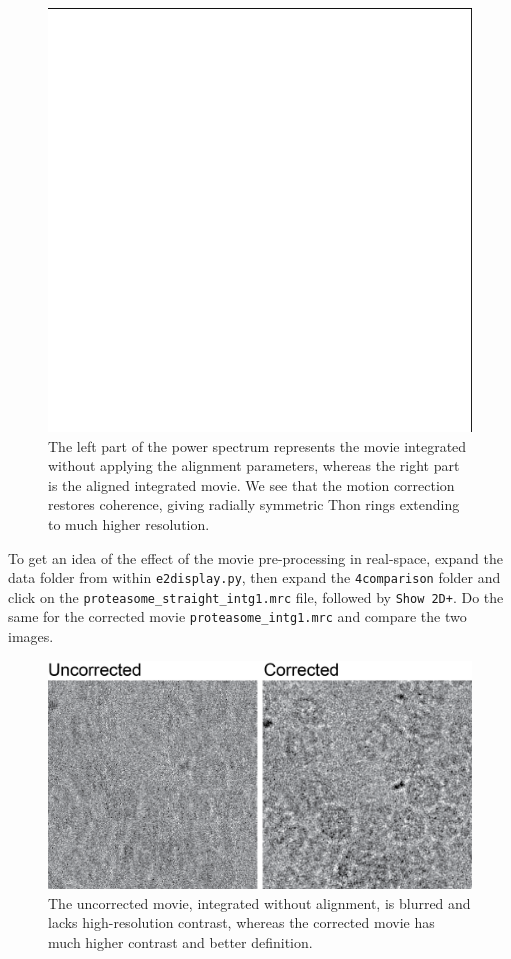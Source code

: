 \documentclass[a4paper,11pt]{article}
\begin{document}
\begin{figure}
\includegraphics[keepaspectratio=true,scale=0.3]{./pspec/pspec}
\caption{The left part of the power spectrum represents the movie integrated without applying the alignment parameters, whereas the right part is the aligned integrated movie. We see that the motion correction restores coherence, giving radially symmetric Thon rings extending to much higher resolution.}
\end{figure}
To get an idea of the effect of the movie pre-processing in real-space, expand the data folder from within \texttt{e2display.py}, then expand the \texttt{4comparison} folder and click on the \texttt{proteasome\_straight\_intg1.mrc} file, followed by \texttt{Show 2D+}. Do the same for the corrected movie \texttt{proteasome\_intg1.mrc} and compare the two images.
\newpage{}
\begin{figure}
\includegraphics[keepaspectratio=true,scale=0.7]{./straightvsintg/straightvsintg}
\caption{The uncorrected movie, integrated without alignment, is blurred and lacks high-resolution contrast, whereas the corrected movie has much higher contrast and better definition.}
\end{figure}
\end{document}
